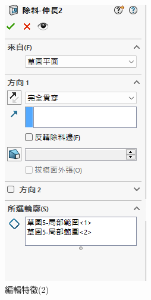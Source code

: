 \begin{figure}[h!]
\begin{minipage}[b]{0.35\textwidth}
        \includegraphics[width=\textwidth,height=0.25\textheight]{./../images/6-1-14} 
        \caption{編輯特徵(2)}
        \label{fig:feature1}
    \end{minipage}
\end{figure}

\newpage

